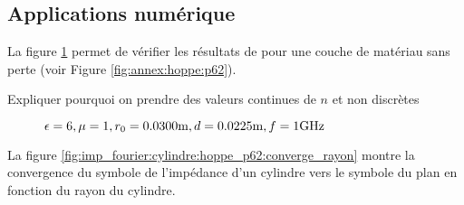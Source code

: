     \subsection{Applications numérique}

        La figure \ref{fig:imp_fourier:cylindre:hoppe_p62} permet de vérifier les résultats de \cite[p.~62]{hoppe_impedance_1995} pour une couche de matériau sans perte (voir Figure \ref{fig:annex:hoppe:p62}).

        \begin{TODO}
  Expliquer pourquoi on prendre des valeurs continues de \(n\) et non discrètes
\end{TODO}

        \begin{figure}[!hbt]
            \centering
            \caption{\(\epsilon = 6, \mu = 1, r_0 = 0.0300\text{m}, d=0.0225\text{m}, f=1\text{GHz}\)}
            \label{fig:imp_fourier:cylindre:hoppe_p62}
        \end{figure}
        
        La figure \ref{fig:imp_fourier:cylindre:hoppe_p62:converge_rayon} montre la convergence du symbole de l'impédance d'un cylindre vers le symbole du plan en fonction du rayon du cylindre.

